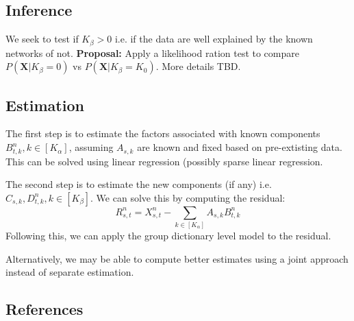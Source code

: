 \documentclass{article}
\begin{document}
\subsection{Inference}
We seek to test if $K_\beta >0$ i.e. if the data are well explained by the known networks of not. {\bf Proposal:} Apply a likelihood ration test to compare $P(\mathbf{X}|K_\beta=0)$ vs $P(\mathbf{X}|K_\beta=K_0)$. More details TBD.

\subsection{Estimation}
The first step is to estimate the factors associated with known components $B^n_{t, k}, {k \in [K_\alpha]}$, assuming $A_{s, k}$ are known and fixed based on pre-extisting data. This can be solved using linear regression (possibly sparse linear regression.

The second step is to estimate the new components (if any) i.e. $C_{s, k}, D^n_{t, k}, {k \in [K_\beta]}$. We can solve this by computing the residual:
$$R^{n}_{s,t} =  X^{n}_{s,t} - \sum_{k \in [K_\alpha]} A_{s, k} B^n_{t, k} $$
Following this, we can apply the group dictionary level model 
to the residual.

Alternatively, we may be able to compute better estimates using a joint approach instead of separate estimation. %
\newpage
\subsection*{References}


\end{document}
